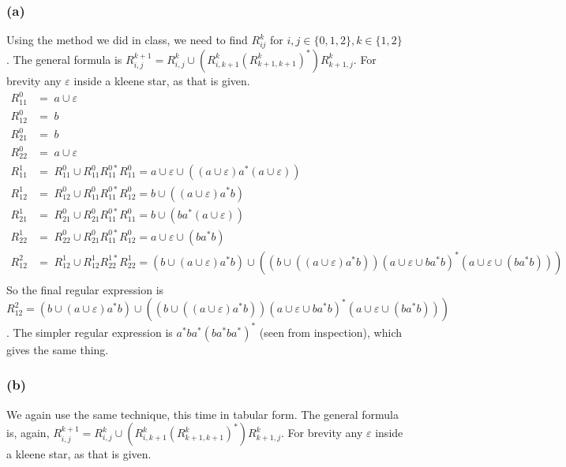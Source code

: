 \documentclass[english]{article}
\begin{document}
\subsubsection*{(a)}
Using the method we did in class, we need to find $R_{ij}^k$ for $i,j \in \{0,1,2\}, k \in \{1,2\}$. The general formula is
$ R_{i,j}^{k+1} = R_{i,j}^{k} \cup (R_{i,k+1}^{k} (R_{k+1,k+1}^{k})^{*}) R_{k+1,j}^{k} $. For brevity any $\varepsilon$ inside a kleene star, as that is given.
\begin{align*}
R_{11}^{0} &=\; a\cup\varepsilon \\
R_{12}^{0} &=\; b \\
R_{21}^{0} &=\; b \\
R_{22}^{0} &=\; a\cup\varepsilon \\
R_{11}^{1} &=\; R_{11}^0 \cup R_{11}^0 R_{11}^{0*} R_{11}^0 = a\cup\varepsilon \cup ((a\cup\varepsilon) a^{*} (a\cup\varepsilon)) \\
R_{12}^{1} &=\; R_{12}^0 \cup R_{11}^0 R_{11}^{0*} R_{12}^0 = b \cup ((a\cup\varepsilon) a^{*} b) \\
R_{21}^{1} &=\; R_{21}^0 \cup R_{21}^0 R_{11}^{0*} R_{11}^0 = b \cup (b a^{*} (a\cup\varepsilon)) \\
R_{22}^{1} &=\; R_{22}^0 \cup R_{21}^0 R_{11}^{0*} R_{12}^0 = a\cup\varepsilon \cup (b a^{*} b) \\
R_{12}^{2} &=\; R_{12}^1 \cup R_{12}^1 R_{22}^{1*} R_{22}^1 = (b \cup (a\cup\varepsilon) a^{*} b) \cup ((b \cup ((a\cup\varepsilon) a^{*} b)) (a\cup\varepsilon \cup b a^{*} b)^{*} (a\cup\varepsilon \cup (b a^{*} b))) \\
\end{align*}
So the final regular expression is $R_{12}^{2} = (b \cup (a\cup\varepsilon) a^{*} b) \cup ((b \cup ((a\cup\varepsilon) a^{*} b)) (a\cup\varepsilon \cup b a^{*} b)^{*} (a\cup\varepsilon \cup (b a^{*} b)))$. The simpler regular expression is $a^{*} b a^{*} (b a^{*} b a^{*})^{*}$ (seen from inspection), which gives the same thing.

\subsubsection*{(b)}
We again use the same technique, this time in tabular form. The general formula is, again, 
$ R_{i,j}^{k+1} = R_{i,j}^{k} \cup (R_{i,k+1}^{k} (R_{k+1,k+1}^{k})^{*}) R_{k+1,j}^{k} $. For brevity any $\varepsilon$ inside a kleene star, as that is given.
\end{document}
